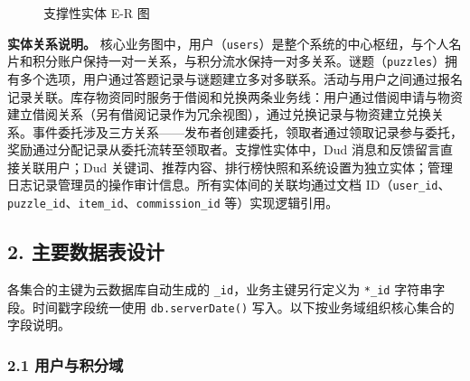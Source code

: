 \documentclass[a4paper,12pt]{article}
\begin{document}
\begin{figure}[H]
{
  }
  \caption{支撑性实体 E-R 图}
  \label{fig:er-support}
\end{figure}

\textbf{实体关系说明。} 核心业务图中，用户（\texttt{users}）是整个系统的中心枢纽，与个人名片和积分账户保持一对一关系，与积分流水保持一对多关系。谜题（\texttt{puzzles}）拥有多个选项，用户通过答题记录与谜题建立多对多联系。活动与用户之间通过报名记录关联。库存物资同时服务于借阅和兑换两条业务线：用户通过借阅申请与物资建立借阅关系（另有借阅记录作为冗余视图），通过兑换记录与物资建立兑换关系。事件委托涉及三方关系——发布者创建委托，领取者通过领取记录参与委托，奖励通过分配记录从委托流转至领取者。支撑性实体中，Dud 消息和反馈留言直接关联用户；Dud 关键词、推荐内容、排行榜快照和系统设置为独立实体；管理日志记录管理员的操作审计信息。所有实体间的关联均通过文档 ID（\texttt{user\_id}、\texttt{puzzle\_id}、\texttt{item\_id}、\texttt{commission\_id} 等）实现逻辑引用。

\subsection{2. 主要数据表设计}

各集合的主键为云数据库自动生成的 \texttt{\_id}，业务主键另行定义为 \texttt{*\_id} 字符串字段。时间戳字段统一使用 \texttt{db.serverDate()} 写入。以下按业务域组织核心集合的字段说明。

\subsubsection*{2.1 用户与积分域}
\end{document}
